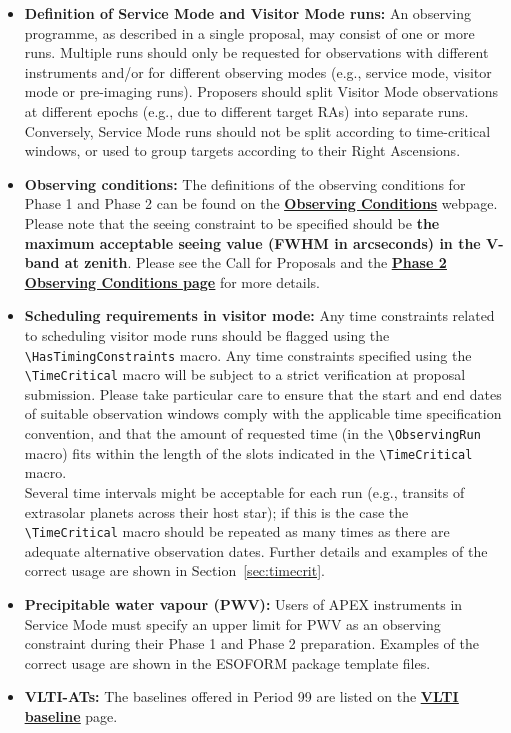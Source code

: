 \documentclass{article}
\begin{document}
\begin{itemize}
\item{\bf Definition of Service Mode and Visitor Mode runs: }
An observing programme, as described in a single proposal, may consist of one or more runs.
Multiple runs should only be requested for observations with different instruments and/or for different observing modes (e.g., service mode, visitor mode or pre-imaging runs).  Proposers should split Visitor Mode observations at different epochs (e.g., due to different target RAs) into separate runs. Conversely, Service Mode runs should not be split according to time-critical windows, or used to group targets according to their Right Ascensions.


\item{\bf Observing conditions:} The definitions of the observing conditions for Phase 1 and Phase 2
can be found on the  \href{http://www.eso.org/sci/observing/phase2/ObsConditions.html}{\bf \underline{Observing Conditions}} webpage.
Please note that the seeing constraint to be specified should be 
{\bf the maximum acceptable seeing value (FWHM in arcseconds) in the V-band at zenith}.
Please see the Call for Proposals and the 
\href{http://www.eso.org/sci/observing/phase2/ObsConditions.html}{\bf\underline{Phase 2 Observing Conditions page}}
for more details.


\item{\bf Scheduling requirements in visitor mode: }
Any time constraints related to scheduling visitor mode runs should be flagged
using the \verb|\HasTimingConstraints| macro.
Any time constraints specified using the \verb|\TimeCritical| macro 
will be subject to a strict verification  at proposal submission. Please take
particular care to ensure
that the start and end dates of suitable observation windows comply
with the applicable time specification convention, and that the
amount of requested time (in the \verb|\ObservingRun| macro) fits
within the length of the slots indicated in the
\verb|\TimeCritical| macro.  \\
Several time intervals might be acceptable for each run 
(e.g., transits of extrasolar planets
across their host star); if this is the case the \verb|\TimeCritical| macro should be 
repeated as many   times as there are adequate alternative observation dates.
Further details and examples of the
correct usage are shown in Section~\ref{sec:timecrit}. 

\item \textbf{Precipitable water vapour (PWV):} Users of
APEX instruments in Service Mode must specify an upper limit for PWV
  as an observing constraint during their Phase 1 and Phase 2
  preparation. Examples of the correct usage are shown in the ESOFORM package 
  template files.

 \item{\bf VLTI-ATs:} The baselines offered in Period 99 are listed on the
\href{http://www.eso.org/sci/facilities/paranal/telescopes/vlti/configuration/index.html}
{\bf\underline{VLTI baseline}} page.

\end{itemize}
\end{document}
